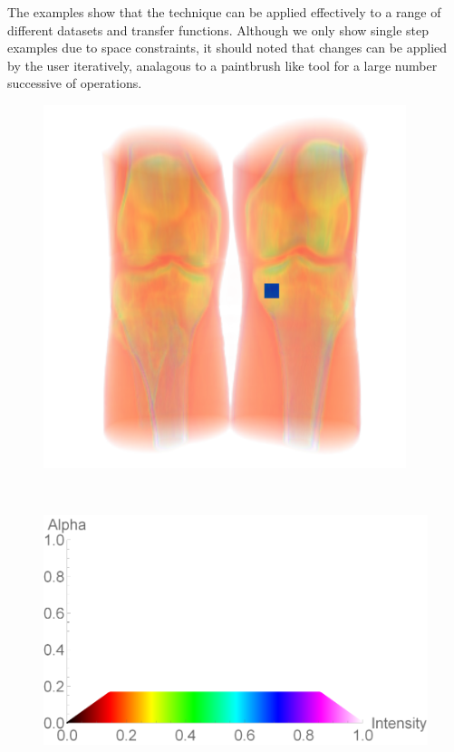 \documentclass[twoside,twocolumn,10pt]{article}
\begin{document}
The examples show that the technique can be applied effectively to a range of different datasets and transfer functions. Although we only show single step examples due to space constraints, it should noted that changes can be applied by the user iteratively, analagous to a paintbrush like tool for a large number successive of operations.

\begin{figure}
	\centering
	\begin{minipage}{.1\textwidth}
		\centering
		\includegraphics[width=1\linewidth]{CT-Knee_crop}
		\label{fig:CT-Knee}
	\end{minipage}~
	\begin{minipage}{.12\textwidth}
		\centering
		\includegraphics[width=1\linewidth]{tf_CT-Knee}

\end{minipage}
\end{figure}
\end{document}

